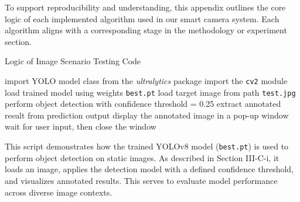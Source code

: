 \documentclass[journal,transmag]{IEEEtran}
\begin{document}
\clearpage
{}
To support reproducibility and understanding, this appendix outlines the core logic of each implemented algorithm used in our smart camera system. Each algorithm aligns with a corresponding stage in the methodology or experiment section.
\vspace{-0.5em}

\begin{algorithm}[H]
\caption{Logic of Image Scenario Testing Code}
\begin{algorithmic}[1]
\STATE import YOLO model class from the \textit{ultralytics} package
\STATE import the \texttt{cv2} module
\STATE load trained model using weights \texttt{best.pt}
\STATE load target image from path \texttt{test.jpg}
\STATE perform object detection with confidence threshold = 0.25
\STATE extract annotated result from prediction output
\STATE display the annotated image in a pop-up window
\STATE wait for user input, then close the window
\end{algorithmic}
\end{algorithm}
\vspace{-5em}
This script demonstrates how the trained YOLOv8 model (\texttt{best.pt}) is used to perform object detection on static images. As described in Section III-C-i, it loads an image, applies the detection model with a defined confidence threshold, and visualizes annotated results. This serves to evaluate model performance across diverse image contexts.
\end{document}

